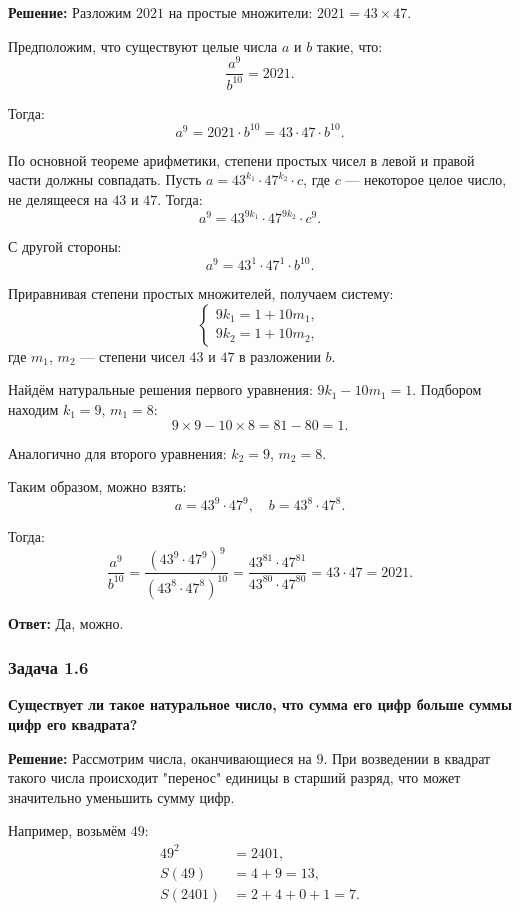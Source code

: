 \documentclass[12pt, a4paper]{article}
\begin{document}
\textbf{Решение:}
Разложим $2021$ на простые множители: $2021 = 43 \times 47$.

Предположим, что существуют целые числа $a$ и $b$ такие, что:
\[
\frac{a^9}{b^{10}} = 2021.
\]

Тогда:
\[
a^9 = 2021 \cdot b^{10} = 43 \cdot 47 \cdot b^{10}.
\]

По основной теореме арифметики, степени простых чисел в левой и правой части должны совпадать. Пусть $a = 43^{k_1} \cdot 47^{k_2} \cdot c$, где $c$ — некоторое целое число, не делящееся на $43$ и $47$. Тогда:
\[
a^9 = 43^{9k_1} \cdot 47^{9k_2} \cdot c^9.
\]

С другой стороны:
\[
a^9 = 43^1 \cdot 47^1 \cdot b^{10}.
\]

Приравнивая степени простых множителей, получаем систему:
\[
\begin{cases}
9k_1 = 1 + 10m_1, \\
9k_2 = 1 + 10m_2,
\end{cases}
\]
где $m_1$, $m_2$ — степени чисел $43$ и $47$ в разложении $b$.

Найдём натуральные решения первого уравнения: $9k_1 - 10m_1 = 1$. Подбором находим $k_1 = 9$, $m_1 = 8$:
\[
9 \times 9 - 10 \times 8 = 81 - 80 = 1.
\]

Аналогично для второго уравнения: $k_2 = 9$, $m_2 = 8$.

Таким образом, можно взять:
\[
a = 43^9 \cdot 47^9,\quad b = 43^8 \cdot 47^8.
\]

Тогда:
\[
\frac{a^9}{b^{10}} = \frac{(43^9 \cdot 47^9)^9}{(43^8 \cdot 47^8)^{10}} = \frac{43^{81} \cdot 47^{81}}{43^{80} \cdot 47^{80}} = 43 \cdot 47 = 2021.
\]

\textbf{Ответ:} Да, можно.

\subsubsection*{Задача 1.6}
\textbf{Существует ли такое натуральное число, что сумма его цифр больше суммы цифр его квадрата?}

\textbf{Решение:}
Рассмотрим числа, оканчивающиеся на $9$. При возведении в квадрат такого числа происходит "перенос" единицы в старший разряд, что может значительно уменьшить сумму цифр.

Например, возьмём $49$:
\begin{align*}
49^2 &= 2401, \\
S(49) &= 4 + 9 = 13, \\
S(2401) &= 2 + 4 + 0 + 1 = 7.
\end{align*}
\end{document}
